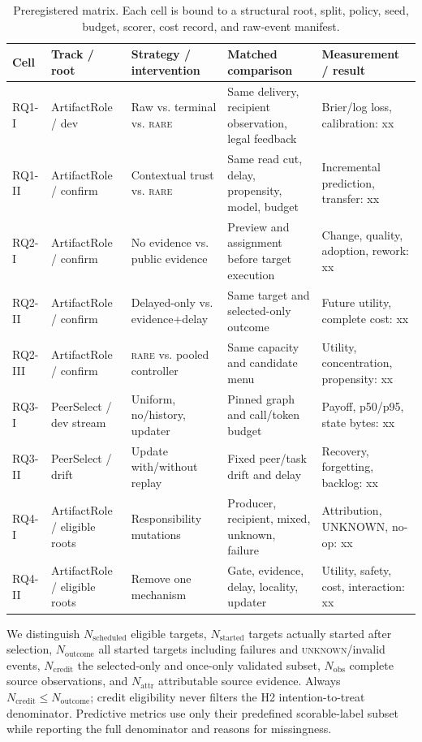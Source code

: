 \documentclass[sigconf,anonymous]{aamas}
\newcommand{\rare}{\textsc{rare}}
\newcommand{\unknown}{\textsc{unknown}}
\begin{document}
\begin{table}[t]
\centering\scriptsize
\setlength{\tabcolsep}{2.6pt}
\begin{tabular}{p{}p{}p{}p{}p{}}
\toprule
Cell & Track / root & Strategy / intervention & Matched comparison & Measurement / result \\
\midrule
RQ1-I & ArtifactRole / dev & Raw vs. terminal vs. \rare{} & Same delivery, recipient observation, legal feedback & Brier/log loss, calibration: xx \\
RQ1-II & ArtifactRole / confirm & Contextual trust vs. \rare{} & Same read cut, delay, propensity, model, budget & Incremental prediction, transfer: xx \\
RQ2-I & ArtifactRole / confirm & No evidence vs. public evidence & Preview and assignment before target execution & Change, quality, adoption, rework: xx \\
RQ2-II & ArtifactRole / confirm & Delayed-only vs. evidence+delay & Same target and selected-only outcome & Future utility, complete cost: xx \\
RQ2-III & ArtifactRole / confirm & \rare{} vs. pooled controller & Same capacity and candidate menu & Utility, concentration, propensity: xx \\
RQ3-I & PeerSelect / dev stream & Uniform, no/history, updater & Pinned graph and call/token budget & Payoff, p50/p95, state bytes: xx \\
RQ3-II & PeerSelect / drift & Update with/without replay & Fixed peer/task drift and delay & Recovery, forgetting, backlog: xx \\
RQ4-I & ArtifactRole / eligible roots & Responsibility mutations & Producer, recipient, mixed, unknown, failure & Attribution, UNKNOWN, no-op: xx \\
RQ4-II & ArtifactRole / eligible roots & Remove one mechanism & Gate, evidence, delay, locality, updater & Utility, safety, cost, interaction: xx \\
\bottomrule
\end{tabular}
\caption{Preregistered matrix. Each cell is bound to a structural root, split, policy, seed, budget, scorer, cost record, and raw-event manifest.}
\label{tab:matrix}
\end{table}

We distinguish $N_{\mathrm{scheduled}}$ eligible targets, $N_{\mathrm{started}}$ targets actually started after selection, $N_{\mathrm{outcome}}$ all started targets including failures and \unknown{}/invalid events, $N_{\mathrm{credit}}$ the selected-only and once-only validated subset, $N_{\mathrm{obs}}$ complete source observations, and $N_{\mathrm{attr}}$ attributable source evidence. Always $N_{\mathrm{credit}}\leq N_{\mathrm{outcome}}$; credit eligibility never filters the H2 intention-to-treat denominator. Predictive metrics use only their predefined scorable-label subset while reporting the full denominator and reasons for missingness.
\end{document}
